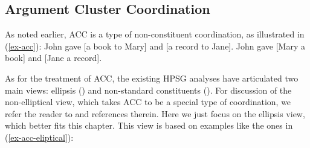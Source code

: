 {\iffalse{
To illustrate, an English verb form mismatch is depicted in (\ref{verbform}), from \citep[see][5]{Shiraishi2019}, where the left conjunct requires a participle while the shared material contains an infinitive form of the verb \textit{appear}.

\ea Some new hybrid models already have, and others soon will appear in the automobile industry.\label{verbform}

\citep{Shiraishi2019} capture verb form mismatch of this kind by introducing into their analysis of RNR the feature LID, which carries lexeme identity information. That is, this feature ensures semantic and syntactic category identity but ignores differences introduced by inflectional suffixes, with the result that the participle and the infinitive in (\ref{verbform}) count as lexeme-identical. RNR is licensed by including the LID feature in the MP feature also used in \citet{Chaves2014} (see (\ref{bpd})).
}\fi


\subsection{Argument Cluster Coordination}

As noted earlier, ACC is a type of non-constituent coordination, as
illustrated in (\ref{ex-acc}):
%
%
\eal
\label{ex-acc}
\ex John gave [a book to Mary] and [a record to Jane].   \label{acc-here}
\ex John gave [Mary a book] and [Jane a record].  \label{acc-1}
\zl
%
%

As for the treatment of ACC, the existing HPSG analyses have articulated two main views: ellipsis
(\citealt{Yatabe2001, Crysmann2003, Beavers2004}) and
non-standard constituents (\citealt{Mouret2006}). For discussion of
the non-elliptical view, which takes ACC to be a special type of coordination,
we refer the reader to  and references 
therein. Here we just focus on the ellipsis view, which better fits this chapter. This view is based on examples like the ones in (\ref{ex-acc-eliptical}):%

}
